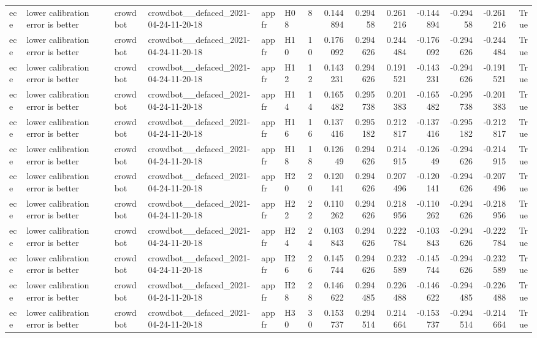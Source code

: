 \begin{longtable}{llllllrrrrrrrr}
ece & lower calibration error is better & crowdbot & crowdbot\_\_defaced\_2021-04-24-11-20-18 & appfr & H08 & 8 & 0.144894 & 0.29458 & 0.261216 & -0.144894 & -0.29458 & -0.261216 & True \\
ece & lower calibration error is better & crowdbot & crowdbot\_\_defaced\_2021-04-24-11-20-18 & appfr & H10 & 10 & 0.176092 & 0.294626 & 0.244484 & -0.176092 & -0.294626 & -0.244484 & True \\
ece & lower calibration error is better & crowdbot & crowdbot\_\_defaced\_2021-04-24-11-20-18 & appfr & H12 & 12 & 0.143231 & 0.294626 & 0.191521 & -0.143231 & -0.294626 & -0.191521 & True \\
ece & lower calibration error is better & crowdbot & crowdbot\_\_defaced\_2021-04-24-11-20-18 & appfr & H14 & 14 & 0.165482 & 0.295738 & 0.201383 & -0.165482 & -0.295738 & -0.201383 & True \\
ece & lower calibration error is better & crowdbot & crowdbot\_\_defaced\_2021-04-24-11-20-18 & appfr & H16 & 16 & 0.137416 & 0.295182 & 0.212817 & -0.137416 & -0.295182 & -0.212817 & True \\
ece & lower calibration error is better & crowdbot & crowdbot\_\_defaced\_2021-04-24-11-20-18 & appfr & H18 & 18 & 0.12649 & 0.294626 & 0.214915 & -0.12649 & -0.294626 & -0.214915 & True \\
ece & lower calibration error is better & crowdbot & crowdbot\_\_defaced\_2021-04-24-11-20-18 & appfr & H20 & 20 & 0.120141 & 0.294626 & 0.207496 & -0.120141 & -0.294626 & -0.207496 & True \\
ece & lower calibration error is better & crowdbot & crowdbot\_\_defaced\_2021-04-24-11-20-18 & appfr & H22 & 22 & 0.110262 & 0.294626 & 0.218956 & -0.110262 & -0.294626 & -0.218956 & True \\
ece & lower calibration error is better & crowdbot & crowdbot\_\_defaced\_2021-04-24-11-20-18 & appfr & H24 & 24 & 0.103843 & 0.294626 & 0.222784 & -0.103843 & -0.294626 & -0.222784 & True \\
ece & lower calibration error is better & crowdbot & crowdbot\_\_defaced\_2021-04-24-11-20-18 & appfr & H26 & 26 & 0.145744 & 0.294626 & 0.232589 & -0.145744 & -0.294626 & -0.232589 & True \\
ece & lower calibration error is better & crowdbot & crowdbot\_\_defaced\_2021-04-24-11-20-18 & appfr & H28 & 28 & 0.146622 & 0.294485 & 0.226488 & -0.146622 & -0.294485 & -0.226488 & True \\
ece & lower calibration error is better & crowdbot & crowdbot\_\_defaced\_2021-04-24-11-20-18 & appfr & H30 & 30 & 0.153737 & 0.294514 & 0.214664 & -0.153737 & -0.294514 & -0.214664 & True \\

\end{longtable}
